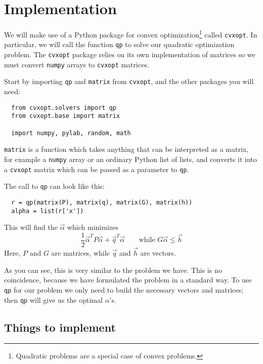 \documentclass{article}
\begin{document}
\section{Implementation}

We will make use of a Python package for convex
optimization\footnote{Quadratic problems are a special case of convex
  problems.} called \texttt{cvxopt}.  In particular, we will call the
function \texttt{qp} to solve our quadratic optimization problem.  The
\texttt{cvxopt} package relies on its own implementation of matrices
so we must convert \texttt{numpy} arrays to \texttt{cvxopt}
matrices.

Start by importing \texttt{qp} and \texttt{matrix} from
\texttt{cvxopt}, and the other packages you will need:

\begin{lstlisting}
  from cvxopt.solvers import qp
  from cvxopt.base import matrix

  import numpy, pylab, random, math
\end{lstlisting}

\texttt{matrix} is a function which takes anything that can be
interpreted as a matrix, for example a \texttt{numpy} array or an
ordinary Python list of lists, and converts it into a \texttt{cvxopt}
matrix which can be passed as a parameter to \texttt{qp}.

The call to \texttt{qp} can look like this:
\begin{lstlisting}
  r = qp(matrix(P), matrix(q), matrix(G), matrix(h))
  alpha = list(r['x'])
\end{lstlisting}
This will find the \(\vec{\alpha}\) which minimizes
\begin{equation}\label{eq:qp}
  \frac{1}{2}\vec{\alpha}^T P\vec{\alpha} + \vec{q}^T\vec{\alpha} \qquad \textrm{while }
  G\vec{\alpha}\le \vec{h}
\end{equation}
Here, \(P\) and \(G\) are matrices, while \(\vec{q}\) and \(\vec{h}\) are vectors.

As you can see, this is very similar to the problem we have.  This is
no coincidence, because we have formulated the problem in a standard
way.  To use \texttt{qp} for our problem we only need to build the
necessary vectors and matrices; then \texttt{qp} will give us the
optimal \(\alpha\)'s.

\subsection{Things to implement}
\end{document}
